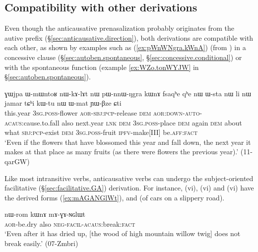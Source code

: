 \subsection{Compatibility with other derivations} \label{sec:anticausative.other.derivations}
Even though the anticausative prenasalization probably originates from the autive  prefix (§\ref{sec:anticausative.direction}), both derivations are compatible with each other, as shown by examples such as  (\ref{ex:pWnWNgra.kWnA}) (from ) in a concessive clause (§\ref{sec:autoben.spontaneous}, §\ref{sec:concessive.conditional}) or with the spontaneous function (example \ref{ex:WZo.tonWYJW} in §\ref{sec:autoben.spontaneous}).

\begin{exe}
\ex \label{ex:pWnWNgra.kWnA}
\gll ɣɯjpa ɯ-mɯntoʁ nɯ-kɤ-lɤt nɯ pɯ-nnɯ-ŋgra kɯnɤ fsaqʰe qʰe nɯ ɯ-sta nɯ li nɯ jamar tɕʰi kɯ-tu nɯ ɯ-mat ɲɯ-βze ɕti  \\
this.year \textsc{3sg}.\textsc{poss}-flower \textsc{aor}-\textsc{sbj}:\textsc{pcp}-release \textsc{dem} \textsc{aor}:\textsc{down}-\textsc{auto}-\textsc{acaus}:cause.to.fall also next.year \textsc{lnk} \textsc{dem} \textsc{3sg}.\textsc{poss}-place \textsc{dem} again \textsc{dem} about what \textsc{sbj}:\textsc{pcp}-exist \textsc{dem} \textsc{3sg}.\textsc{poss}-fruit \textsc{ipfv}-make[III] be.\textsc{aff}:\textsc{fact} \\
\glt `Even if the flowers that have blossomed this year and fall down, the next year it makes at that place as many fruits (as there were flowers the previous year).' (11-qarGW)
\end{exe}

Like most intransitive verbs,  anticausative verbs can undergo the subject-orien\-ted facilitative (§\ref{sec:facilitative.GA})  derivation. For instance,  (vi),  (vi) and  (vi) have the derived forms   (\ref{ex:mAGANGlWt}),  and  (of cars on a slippery road). 

\begin{exe}
\ex \label{ex:mAGANGlWt}
\gll nɯ-rom kɯnɤ mɤ-ɣɤ-ɴɢlɯt  \\
\textsc{aor}-be.dry also \textsc{neg}-\textsc{facil}-\textsc{acaus}:break:\textsc{fact} \\
\glt `Even after it has dried up, [the wood of high mountain willow twig] does not break easily.' (07-Zmbri) 
\end{exe}

